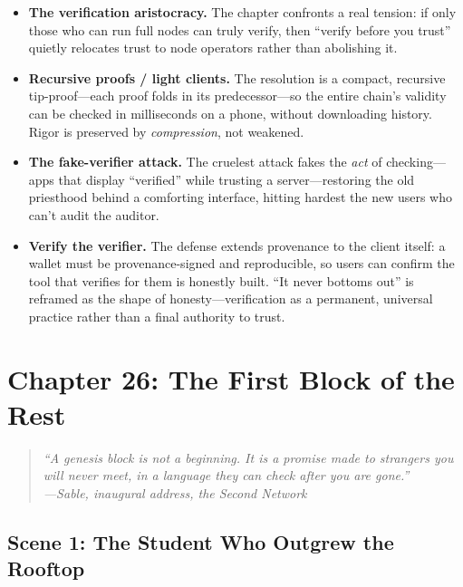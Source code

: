 \documentclass[12pt,letterpaper]{book}
\providecommand{\tightlist}{\setlength{\itemsep}{0pt}\setlength{\parskip}{0pt}}
\begin{document}
\begin{itemize}
\tightlist
\item
  \textbf{The verification aristocracy.} The chapter confronts a real tension: if
  only those who can run full nodes can truly verify, then ``verify before you
  trust'' quietly relocates trust to node operators rather than abolishing it.
\item
  \textbf{Recursive proofs / light clients.} The resolution is a compact, recursive
  tip-proof---each proof folds in its predecessor---so the entire chain's validity
  can be checked in milliseconds on a phone, without downloading history. Rigor is
  preserved by \emph{compression}, not weakened.
\item
  \textbf{The fake-verifier attack.} The cruelest attack fakes the \emph{act} of
  checking---apps that display ``verified'' while trusting a server---restoring the
  old priesthood behind a comforting interface, hitting hardest the new users who
  can't audit the auditor.
\item
  \textbf{Verify the verifier.} The defense extends provenance to the client itself:
  a wallet must be provenance-signed and reproducible, so users can confirm the tool
  that verifies for them is honestly built. ``It never bottoms out'' is reframed as
  the shape of honesty---verification as a permanent, universal practice rather than
  a final authority to trust.
\end{itemize}


\hypertarget{chapter-26-the-first-block-of-the-rest}{%
\section{Chapter 26: The First Block of the
Rest}\label{chapter-26-the-first-block-of-the-rest}}

\begin{quote}
\itshape ``A genesis block is not a beginning. It is a promise made to strangers
you will never meet, in a language they can check after you are gone.''\\
\normalfont\hfill---Sable, inaugural address, the Second Network
\end{quote}

\hypertarget{scene-1-the-student-who-outgrew-the-rooftop}{%
\subsection{Scene 1: The Student Who Outgrew the
Rooftop}\label{scene-1-the-student-who-outgrew-the-rooftop}}
\end{document}
